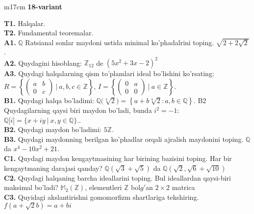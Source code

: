 \documentclass{article}
\begin{document}
\begin{tabular}{m{17cm}}
\textbf{18-variant}
\newline

\textbf{T1.} Halqalar. \\
\textbf{T2.} Fundamental teoremalar. \\
\textbf{A1.} \(\mathbb{Q}\) Ratsianal sonlar maydoni ustida minimal ko'phadalrini toping.
\(\sqrt{2 + 2\sqrt{2}}\). \\
\textbf{A2.} Quydagini hisoblang:
\(\mathbb{Z}_{12}\) de \(\left( 5x^{2} + 3x - 2 \right)^{2}\) \\
\textbf{A3.} Quydagi halqalarning qism to'plamlari ideal bo'lishini ko'rsating: \(R = \left\{ \begin{pmatrix}
a & b \\
0 & c
\end{pmatrix}\ |\ a,b,c \in \mathbb{Z} \right\}\), \(I = \left\{ \begin{pmatrix}
0 & a \\
0 & 0
\end{pmatrix}\ |\ a \in \mathbb{Z} \right\}\). \\
\textbf{B1.} Quydagi halqa bo'ladimi:
\(\mathbb{Q(}\sqrt[3]{2}) = \left\{ a + b\sqrt[3]{2}:a,b \in \mathbb{Q} \right\}\).
B2 Quydagilarning qaysi biri maydon bo'ladi, bunda \(i^{2} = - 1\):
\(\mathbb{Q\lbrack}i\rbrack = \{ x + iy\ |\ x,y \in \mathbb{Q\}}\).. \\
\textbf{B2.} Quydagi maydon bo'ladimi:
\(5\mathbb{Z}\). \\
\textbf{B3.} Quydagi maydonning berilgan ko'phadlar orqali ajralish maydonini toping.
\(\mathbb{Q}\) da \(x^{4} - 10x^{2} + 21\). \\
\textbf{C1.} Quydagi maydon kengaytmasining har birining bazisini toping. Har bir kengaytmaning darajasi qanday?
\(\mathbb{Q}\left( \sqrt{3} + \sqrt{5} \right)\) da \(\mathbb{Q}\left( \sqrt{2},\sqrt{6} + \sqrt{10} \right)\) \\
\textbf{C2.} Quydagi halqaning barcha ideallarini toping. Bul ideallardan qaysi-biri maksimal bo'ladi?
\(\mathbb{M}_{2}\left( \mathbb{Z} \right)\), elementleri \(\mathbb{Z}\) bol\(g'\)an \(2 \times 2\) matrica \\
\textbf{C3.} Quyidagi akslantirishni gomomorfizm shartlariga tekshiring. \(f\left( a + \sqrt{2}b \right) = a + bi\) \\

\end{tabular}
\vspace{1cm}
\end{document}
